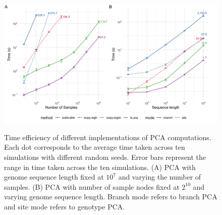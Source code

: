 \begin{figure}
    \centering
    \includegraphics[width=\textwidth]{Figures/Fig2_benchmarking_plot.png}
    \label{fig:benchmarking}
    \caption{Time efficiency of different implementations of PCA computations.
    Each dot corresponds to the average time taken across ten simulations with different random seeds.
    Error bars represent the range in time taken across the ten simulations.
    (A) PCA with genome sequence length fixed at $10^{7}$ and varying the number of samples.
    (B) PCA with number of sample nodes fixed at $2^{10}$ and varying genome sequence length.
    Branch mode refers to branch PCA and site mode refers to genotype PCA.}
\end{figure}

